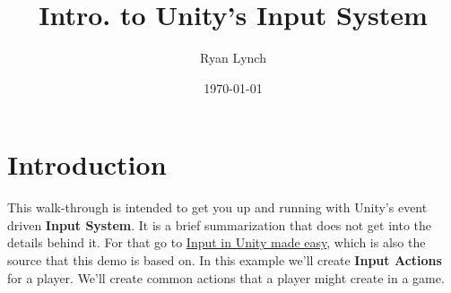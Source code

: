 \documentclass[a4paper,11pt,twoside]{article}
\author{Ryan Lynch}
\date{\today}
\title{Intro. to Unity's Input System}
\begin{document}
\maketitle
\section*{Introduction}
\label{sec:org1d76761}
This walk-through is intended to get you up and running with Unity's event driven \textbf{Input System}. It is a brief summarization that does not get into the details behind it. For that go to \href{https://gamedevbeginner.com/input-in-unity-made-easy-complete-guide-to-the-new-system/}{Input in Unity made easy}, which is also the source that this demo is based on.
In this example we'll create \textbf{Input Actions} for a player. We'll create common actions that a player might create in a game.
\end{document}
